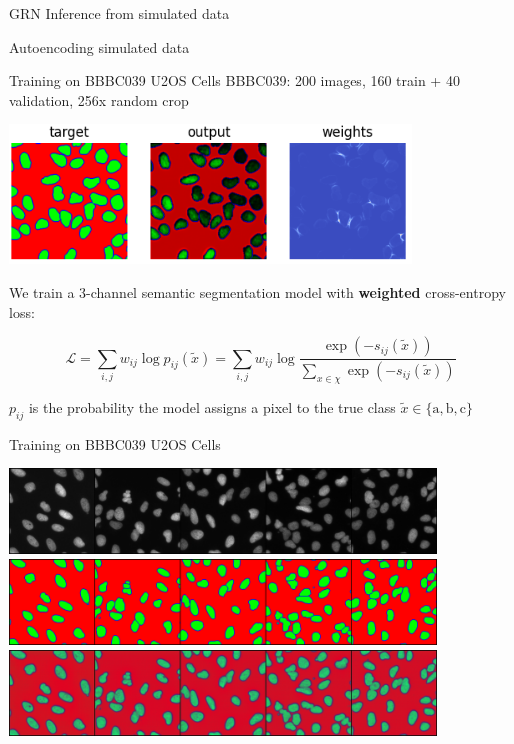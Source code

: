 \documentclass[aspectratio=1610]{beamer}					%
\begin{document}
\begin{frame}{GRN Inference from simulated data}
\end{frame}

\begin{frame}{Autoencoding simulated data}
\end{frame}


\begin{frame}{Training on BBBC039 U2OS Cells}
\vspace{0.1in}
BBBC039: 200 images, 160 train + 40 validation, 256\;x random crop

\begin{center}
\includegraphics[width=0.8\textwidth]{weights.png}
\end{center}

We train a 3-channel semantic segmentation model with \textbf{weighted} cross-entropy loss:

\begin{equation*}
\mathcal{L} = \sum_{i,j} w_{ij}\log p_{ij}(\tilde{x}) = \sum_{i,j} w_{ij}\log \frac{\exp(-s_{ij}(\tilde{x}))}{\sum_{x\in\chi} \exp(-s_{ij}(\tilde{x}))}
\end{equation*}

$p_{ij}$ is the probability the model assigns a pixel to the true class $\tilde{x} \in \{\textrm{a}, \textrm{b}, \textrm{c}\}$

\end{frame}

\begin{frame}{Training on BBBC039 U2OS Cells}

\begin{center}
\includegraphics[width=0.85\textwidth]{input-train.png}
\includegraphics[width=0.85\textwidth]{target-train.png}
\includegraphics[width=0.85\textwidth]{output-train.png}
\end{center}

\end{frame}
\end{document}
